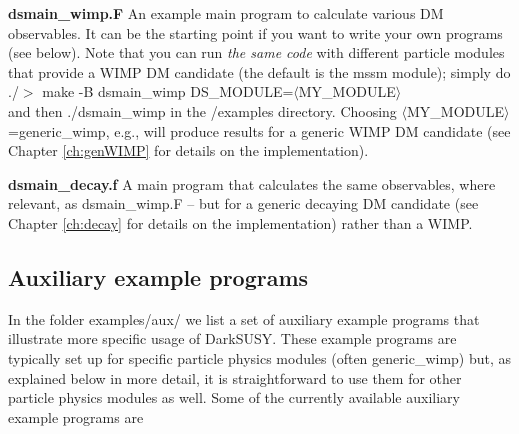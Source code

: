 \documentclass[a4paper,10pt,oneside]{book}
\newcommand{\tb}[1]{{\color{magenta}\bf (TB: #1)}}
\newcommand{\comment}[1]{}
\newcommand{\code}[1]{\ft{#1}}
\newcommand{\codeb}[1]{\ftb{#1}}
\newcommand{\ds}{{\sffamily DarkSUSY}}
\newcommand{\ft}[1]{\textsf{#1}}
\newcommand{\ftb}[1]{{\bfseries \sffamily #1}}
\begin{document}
\begin{description}

\item{\codeb{dsmain\_wimp.F}} An example main program to calculate various DM observables. It can be the starting point if you want to write 
your own programs (see below).
Note that you can run {\it the same code} with different particle modules that provide a WIMP DM candidate (the default is the \code{mssm} module);
simply do\\
{\code{./$>$ make -B dsmain\_wimp DS\_MODULE=$\langle$MY\_MODULE$\rangle$}}\\
 and then \code{./dsmain\_wimp} in the \code{/examples} directory.
Choosing \code{$\langle$MY\_MODULE$\rangle$=generic\_wimp}, e.g., will produce results for a generic WIMP DM candidate 
(see Chapter \ref{ch:genWIMP} for details on the implementation).

\item{\codeb{dsmain\_decay.f}} A main program that calculates the same observables, where relevant, as  \code{dsmain\_wimp.F} -- but for a
generic decaying DM candidate (see Chapter \ref{ch:decay} for details on the implementation) rather than a WIMP.
\end{description}


\subsection{Auxiliary example programs}
\label{sec:aux_ex}

In the folder \code{examples/aux/} we list a set of auxiliary example programs that illustrate
more specific usage of \ds. These example programs are typically set up for specific particle physics 
modules (often \code{generic\_wimp})  but, as explained below in more detail, it is straightforward to use them 
for other particle physics modules as well.
%
Some of the currently available auxiliary example programs are
\end{document}
